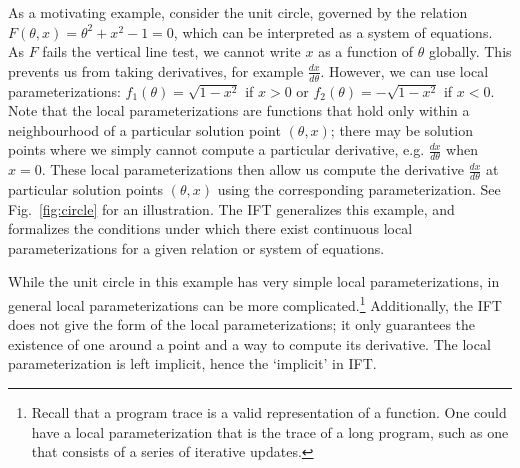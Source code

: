 \documentclass[11pt]{article}
\begin{document}
As a motivating example, consider the unit circle,
governed by the relation $F(\theta,x) = \theta^2 + x^2 - 1 = 0$,
which can be interpreted as a system of equations.
As $F$ fails the vertical line test, we cannot write $x$ as a function of $\theta$ globally.
This prevents us from taking derivatives, for example $\frac{dx}{d\theta}$.
However, we can use local parameterizations: $f_1(\theta) = \sqrt{1-x^2}$ if $x > 0$
or $f_2(\theta) = -\sqrt{1-x^2}$ if $x<0$.
Note that the local parameterizations are functions that hold
only within a neighbourhood of a particular solution point $(\theta,x)$;
there may be solution points where we simply cannot compute a particular derivative,
e.g. $\frac{dx}{d\theta}$ when $x=0$.
These local parameterizations then allow us compute the derivative $\frac{dx}{d\theta}$
at particular solution points $(\theta,x)$ using the corresponding parameterization.
See Fig.~\ref{fig:circle} for an illustration.
The IFT generalizes this example, and formalizes the conditions under which there exist
continuous local parameterizations for a given relation or system of equations.

While the unit circle in this example has very simple local parameterizations,
in general local parameterizations can be more complicated.\footnote{
Recall that a program trace is a valid representation of a function.
One could have a local parameterization that is the trace of a long program,
such as one that consists of a series of iterative updates.
}
Additionally, the IFT does not give the form of the local parameterizations;
it only guarantees the existence of one around a point and a way to compute its derivative.
The local parameterization is left implicit, hence the `implicit' in IFT.
\end{document}
